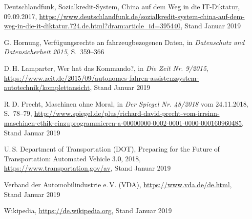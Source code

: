 \documentclass[twoside,a4paper,12pt]{article}
\begin{document}
\begin{thebibliography}{99}
 Deutschlandfunk, Sozialkredit-System, China auf dem Weg in die IT-Diktatur, 09.09.2017, \url{https://www.deutschlandfunk.de/sozialkredit-system-china-auf-dem-weg-in-die-it-diktatur.724.de.html?dram:article_id=395440}, Stand Januar 2019

 G. Hornung, Verfügungsrechte an fahrzeugbezogenen Daten, in \textit{Datenschutz und Datensicherheit 2015}, \mbox{S. 359--366}

 D.\,H. Lamparter, Wer hat das Kommando?, in \textit{Die Zeit Nr. 9/2015}, \\
\url{https://www.zeit.de/2015/09/autonomes-fahren-assistenzsystem-autotechnik/komplettansicht}, Stand Januar 2019

 R.\,D. Precht, Maschinen ohne Moral, in \textit{Der Spiegel Nr. 48/2018} vom 24.11.2018, \mbox{S. 78--79},
\url{http://www.spiegel.de/plus/richard-david-precht-vom-irrsinn-maschinen-ethik-einzuprogrammieren-a-00000000-0002-0001-0000-000160960485}, Stand Januar 2019

 U.\,S. Department of Transportation (DOT), Preparing for the Future of Transportation: Automated Vehicle 3.0, 2018,
\url{https://www.transportation.gov/av}, Stand Januar 2019

 Verband der Automobilindustrie e.\,V. (VDA), \url{https://www.vda.de/de.html}, Stand Januar 2019

 Wikipedia, \url{https://de.wikipedia.org}, Stand Januar 2019

\end{thebibliography}

\newpage
\end{document}
